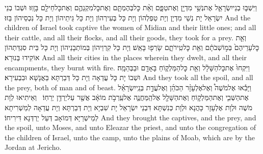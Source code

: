{וַיִּשְׁבּ֧וּ בְנֵי\maqqaf יִשְׂרָאֵ֛ל אֶת\maqqaf נְשֵׁ֥י מִדְיָ֖ן וְאֶת\maqqaf טַפָּ֑ם וְאֵ֨ת כׇּל\maqqaf בְּהֶמְתָּ֧ם וְאֶת\maqqaf כׇּל\maqqaf מִקְנֵהֶ֛ם וְאֶת\maqqaf כׇּל\maqqaf חֵילָ֖ם בָּזָֽזוּ׃}
{וּשְׁבוֹ בְנֵי יִשְׂרָאֵל יָת נְשֵׁי מִדְיָן וְיָת טַפְלְהוֹן וְיָת כָּל בְּעִירְהוֹן וְיָת כָּל גֵּיתֵיהוֹן וְיָת כָּל נִכְסֵיהוֹן בַּזוּ׃}
{And the children of Israel took captive the women of Midian and their little ones; and all their cattle, and all their flocks, and all their goods, they took for a prey.}{}
{וְאֵ֤ת כׇּל\maqqaf עָרֵיהֶם֙ בְּמ֣וֹשְׁבֹתָ֔ם וְאֵ֖ת כׇּל\maqqaf טִֽירֹתָ֑ם שָׂרְפ֖וּ בָּאֵֽשׁ׃}
{וְיָת כָּל קִרְוֵיהוֹן בְּמוֹתְבָנֵיהוֹן וְיָת כָּל בֵּית סִגְדַּתְהוֹן אוֹקִידוּ בְּנוּרָא׃}
{And all their cities in the places wherein they dwelt, and all their encampments, they burnt with fire.}{}
{וַיִּקְחוּ֙ אֶת\maqqaf כׇּל\maqqaf הַשָּׁלָ֔ל וְאֵ֖ת כׇּל\maqqaf הַמַּלְק֑וֹחַ בָּאָדָ֖ם וּבַבְּהֵמָֽה׃}
{וּשְׁבוֹ יָת כָּל עֲדַאָה וְיָת כָּל דְּבַרְתָּא בַּאֲנָשָׁא וּבִבְעִירָא׃}
{And they took all the spoil, and all the prey, both of man and of beast.}{}
{וַיָּבִ֡אוּ אֶל\maqqaf מֹשֶׁה֩ וְאֶל\maqqaf אֶלְעָזָ֨ר הַכֹּהֵ֜ן וְאֶל\maqqaf עֲדַ֣ת בְּנֵֽי\maqqaf יִשְׂרָאֵ֗ל אֶת\maqqaf הַשְּׁבִ֧י וְאֶת\maqqaf הַמַּלְק֛וֹחַ וְאֶת\maqqaf הַשָּׁלָ֖ל אֶל\maqqaf הַֽמַּחֲנֶ֑ה אֶל\maqqaf עַֽרְבֹ֣ת מוֹאָ֔ב אֲשֶׁ֖ר עַל\maqqaf יַרְדֵּ֥ן יְרֵחֽוֹ׃ \setuma }
{וְאֵיתִיאוּ לְוָת מֹשֶׁה וּלְוָת אֶלְעָזָר כָּהֲנָא וּלְוָת כְּנִשְׁתָּא דִּבְנֵי יִשְׂרָאֵל יָת שִׁבְיָא וְיָת דְּבַרְתָּא וְיָת עֲדַאָה לְמַשְׁרִיתָא לְמֵישְׁרַיָּא דְּמוֹאָב דְּעַל יַרְדְּנָא דִּירִיחוֹ׃}
{And they brought the captives, and the prey, and the spoil, unto Moses, and unto Eleazar the priest, and unto the congregation of the children of Israel, unto the camp, unto the plains of Moab, which are by the Jordan at Jericho.}{}
